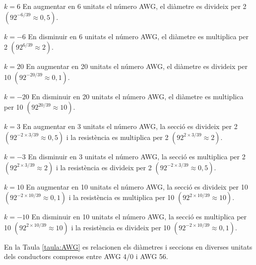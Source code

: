 \begin{list}{}
   {\setlength{\labelwidth}{15mm} \setlength{\leftmargin}{17mm} \setlength{\labelsep}{2mm}}

   \item[$k=6$\hfill] En augmentar en 6  unitats el n\'{u}mero AWG, el di\`{a}metre es divideix per 2
                 $(92^{-6/39}\approx 0{,}5)$.

   \item[$k=-6$\hfill] En disminuir en 6 unitats el n\'{u}mero AWG, el di\`{a}metre es multiplica per 2
                 $(92^{6/39}\approx 2)$.

   \item[$k=20$\hfill] En augmentar en 20  unitats el n\'{u}mero AWG, el di\`{a}metre es divideix per 10
                 $(92^{-20/39}\approx 0{,}1)$.

   \item[$k=-20$\hfill] En disminuir en 20 unitats el n\'{u}mero AWG, el di\`{a}metre es multiplica per 10
                 $(92^{20/39}\approx 10)$.

   \item[$k=3$\hfill] En augmentar en 3 unitats el n\'{u}mero AWG, la secci\'{o} es divideix per 2
                 $(92^{-2\times 3/39}\approx 0{,}5)$ i la resist\`{e}ncia es multiplica per 2
                 $(92^{2\times 3/39}\approx 2)$.

   \item[$k=-3$\hfill] En disminuir en 3 unitats el n\'{u}mero AWG, la secci\'{o} es multiplica per 2
                  $(92^{2\times 3/39}\approx 2)$ i la resist\`{e}ncia es divideix per 2
                  $(92^{-2\times 3/39}\approx 0{,}5)$.

   \item[$k=10$\hfill] En augmentar en 10 unitats el n\'{u}mero AWG, la secci\'{o} es divideix per 10
                 $(92^{-2\times 10/39}\approx 0{,}1)$ i la resist\`{e}ncia es multiplica per 10
                 $(92^{2\times 10/39}\approx 10)$.

   \item[$k=-10$\hfill] En disminuir en 10 unitats el n\'{u}mero AWG, la secci\'{o} es multiplica per 10
                  $(92^{2\times 10/39}\approx 10)$ i la resist\`{e}ncia es divideix per 10
                  $(92^{-2\times 10/39}\approx 0{,}1)$.
\end{list}

En la Taula \vref{taula:AWG} es relacionen els di\`{a}metres i seccions en diverses unitats dels conductors compresos entre AWG 4/0 i AWG 56.



